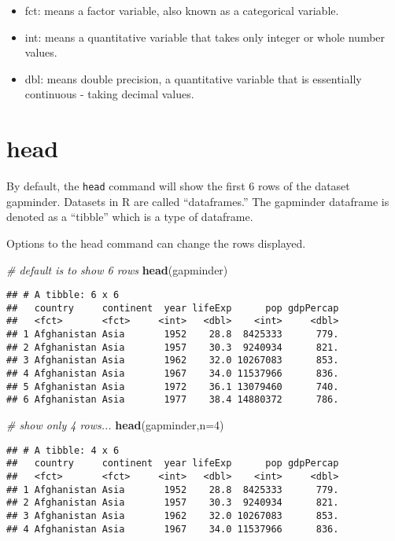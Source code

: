 \documentclass[]{book}
\newenvironment{Shaded}{\begin{snugshade}}{\end{snugshade}}
\newcommand{\KeywordTok}[1]{\textcolor[rgb]{0.13,0.29,0.53}{\textbf{#1}}}
\newcommand{\DataTypeTok}[1]{\textcolor[rgb]{0.13,0.29,0.53}{#1}}
\newcommand{\DecValTok}[1]{\textcolor[rgb]{0.00,0.00,0.81}{#1}}
\newcommand{\CommentTok}[1]{\textcolor[rgb]{0.56,0.35,0.01}{\textit{#1}}}
\newcommand{\NormalTok}[1]{#1}
\providecommand{\tightlist}{%
  \setlength{\itemsep}{0pt}\setlength{\parskip}{0pt}}
\begin{document}
\begin{itemize}
\tightlist
\item
  fct: means a factor variable, also known as a categorical variable.
\item
  int: means a quantitative variable that takes only integer or whole
  number values.
\item
  dbl: means double precision, a quantitative variable that is
  essentially continuous - taking decimal values.
\end{itemize}

\section{head}\label{head}

By default, the \texttt{head} command will show the first 6 rows of the
dataset gapminder. Datasets in R are called ``dataframes.'' The
gapminder dataframe is denoted as a ``tibble'' which is a type of
dataframe.

Options to the head command can change the rows displayed.

\begin{Shaded}
\begin{Highlighting}[]
\CommentTok{# default is to show 6 rows}
\KeywordTok{head}\NormalTok{(gapminder)}
\end{Highlighting}
\end{Shaded}

\begin{verbatim}
## # A tibble: 6 x 6
##   country     continent  year lifeExp      pop gdpPercap
##   <fct>       <fct>     <int>   <dbl>    <int>     <dbl>
## 1 Afghanistan Asia       1952    28.8  8425333      779.
## 2 Afghanistan Asia       1957    30.3  9240934      821.
## 3 Afghanistan Asia       1962    32.0 10267083      853.
## 4 Afghanistan Asia       1967    34.0 11537966      836.
## 5 Afghanistan Asia       1972    36.1 13079460      740.
## 6 Afghanistan Asia       1977    38.4 14880372      786.
\end{verbatim}

\begin{Shaded}
\begin{Highlighting}[]
\CommentTok{# show only 4 rows...}
\KeywordTok{head}\NormalTok{(gapminder,}\DataTypeTok{n=}\DecValTok{4}\NormalTok{)}
\end{Highlighting}
\end{Shaded}

\begin{verbatim}
## # A tibble: 4 x 6
##   country     continent  year lifeExp      pop gdpPercap
##   <fct>       <fct>     <int>   <dbl>    <int>     <dbl>
## 1 Afghanistan Asia       1952    28.8  8425333      779.
## 2 Afghanistan Asia       1957    30.3  9240934      821.
## 3 Afghanistan Asia       1962    32.0 10267083      853.
## 4 Afghanistan Asia       1967    34.0 11537966      836.
\end{verbatim}
\end{document}
